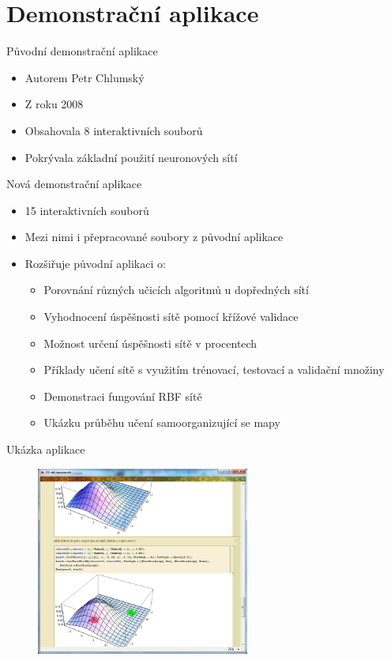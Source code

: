 \documentclass{beamer}
\begin{document}
\section{Demonstrační aplikace}
\begin{frame}{Původní demonstrační aplikace}
\begin{itemize}
\item Autorem Petr Chlumský
\item Z roku 2008
\item Obsahovala 8 interaktivních souborů
\item Pokrývala základní použití neuronových sítí
\end{itemize}
\end{frame}
\begin{frame}{Nová demonstrační aplikace}
\begin{itemize}
\item 15 interaktivních souborů
\item Mezi nimi i přepracované soubory z původní aplikace
\item Rozšiřuje původní aplikaci o:
\begin{itemize}
\item Porovnání různých učicích algoritmů u dopředných sítí
\item Vyhodnocení úspěšnosti sítě pomocí křížové validace
\item Možnost určení úspěšnosti sítě v procentech
\item Příklady učení sítě s využitím trénovací, testovací a validační množiny
\item Demonstraci fungování RBF sítě
\item Ukázku průběhu učení samoorganizující se mapy
\end{itemize}
\end{itemize}
\end{frame}
\begin{frame}{Ukázka aplikace}
\begin{figure}
   \includegraphics[width=7cm]{ukazka07.png}
\end{figure}
\end{frame}
\end{document}
